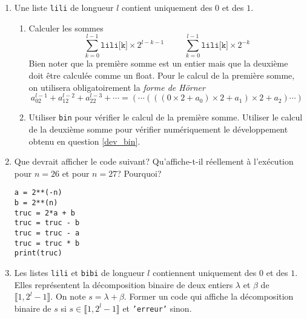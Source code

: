 \begin{enumerate}
  \item Une liste \texttt{lili} de longueur $l$ contient uniquement des $0$ et des $1$.
\begin{enumerate}
  \item   Calculer les sommes
  \begin{displaymath}
   \sum_{k=0}^{l-1}\texttt{lili[k]} \times 2^{l-k-1}\hspace{1cm}
   \sum_{k=0}^{l-1}\texttt{lili[k]} \times 2^{-k}
  \end{displaymath}
Bien noter que la première somme est un entier mais que la deuxième doit être calculée comme un float. Pour le calcul de la première somme, on utilisera obligatoirement la \emph{forme de Hörner}
\begin{displaymath}
  a_02^{l-1}+a_12^{l-2}+a_22^{l-3}+ \cdots = 
\left( \cdots \left( \left( (0\times 2 + a_0) \times 2 + a_1\right) \times 2 + a_2\right) \cdots \right) 
\end{displaymath}

  \item Utiliser \texttt{bin} pour vérifier le calcul de la première somme. Utiliser le calcul de la deuxième somme pour vérifier numériquement le développement obtenu en question \ref{dev_bin}.
\end{enumerate} 

\item Que devrait afficher le code suivant? Qu'affiche-t-il réellement à l'exécution pour $n =26$ et pour $n=27$? Pourquoi?
\begin{verbatim}
a = 2**(-n)
b = 2**(n)
truc = 2*a + b
truc = truc - b
truc = truc - a
truc = truc * b
print(truc)
\end{verbatim}

\item Les listes \texttt{lili} et \texttt{bibi} de longueur $l$ contiennent uniquement des $0$ et des $1$. Elles représentent la décomposition binaire de deux entiers $\lambda$ et $\beta$ de $\llbracket 1, 2^l -1\rrbracket$. On note $s=\lambda + \beta$.\newline
Former un code qui affiche la décomposition binaire de $s$ si $s\in \llbracket 1, 2^l -1\rrbracket$ et \texttt{'erreur'} sinon. 


\end{enumerate}
